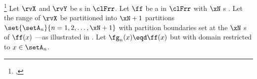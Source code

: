 \begin{theorem}
\footnote{
  ,
  }
\label{thm:Y=f(X)}
\label{thm:YfX}
Let $\rvX$ and $\rvY$ be s in $\clFrr$.
Let $\ff$ be a  in $\clFrr$
with $\xN$ s .
Let the range of $\rvX$ be partitioned into $\xN+1$ partitions
$\set{\setA_n}{n=1,2,\ldots,\xN+1}$
with partition boundaries set at the $\xN$ s of $\ff(x)$%
---as illustrated in .
Let $\fg_n(x)\eqd\ff(x)$ but with domain restricted to $x\in\setA_n$.
\end{theorem}
